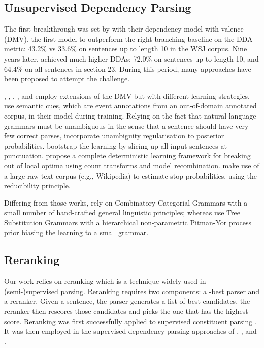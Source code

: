 \documentclass[11pt,letterpaper]{article}
\begin{document}
\subsection{Unsupervised Dependency Parsing}
\label{section related work - udp}

The first breakthrough was set by 
with their dependency model with valence (DMV), the first 
model to outperform the right-branching baseline on the 
DDA metric: 43.2\% vs 33.6\% on sentences up to length 10 
in the WSJ corpus. Nine years later,  
achieved much higher DDAs: 72.0\% 
on sentences up to length 10, and 64.4\% on all sentences 
in section 23. During this period,  
many approaches have been proposed to attempt the challenge.

, , 
, , 
and 
employ extensions of the DMV but with different learning strategies. 
 use semantic cues, which are event 
annotations from an out-of-domain annotated corpus, in their model 
during training. 
Relying on the fact that natural language grammars must be unambiguous 
in the sense that a sentence should have very few correct parses, 
 incorporate unambiguity regularisation 
to posterior probabilities.  bootstrap 
the learning by slicing up all input sentences at punctuation. 
 propose a complete deterministic 
learning framework for breaking out of local optima using count transforms 
and model recombination.  make use 
of a large raw text corpus (e.g., Wikipedia) to estimate stop probabilities,
using the reducibility principle. 

Differing from those works, 
 rely on Combinatory Categorial Grammars with a 
small number of hand-crafted general linguistic principles; whereas 
 use Tree Substitution Grammars 
with a hierarchical non-parametric Pitman-Yor process prior 
biasing the learning to a small grammar. 

\subsection{Reranking}

Our work relies on reranking 
which is a technique widely used in (semi-)supervised parsing. 
Reranking requires two components: a -best parser and a reranker. 
Given a sentence, the parser generates a list of  best
candidates, the reranker then rescores those candidates and picks
the one that has the highest score. 
Reranking was first successfully applied to supervised constituent parsing
\cite{DBLP:conf/icml/Collins00,DBLP:conf/acl/CharniakJ05}. 
It was then employed in the supervised dependency parsing approaches 
of , 
, and .
\end{document}
